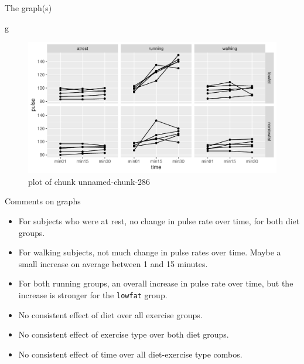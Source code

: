 \documentclass[ignorenonframetext,]{beamer}
\newenvironment{Shaded}{\begin{snugshade}}{\end{snugshade}}
\newcommand{\NormalTok}[1]{#1}
\begin{document}
\begin{frame}[fragile]{The graph(s)}
\protect\hypertarget{the-graphs}{}

\begin{Shaded}
\begin{Highlighting}[]
\NormalTok{g}
\end{Highlighting}
\end{Shaded}

\begin{figure}
\centering
\includegraphics{figure/unnamed-chunk-286-1.pdf}
\caption{plot of chunk unnamed-chunk-286}
\end{figure}

\end{frame}

\begin{frame}[fragile]{Comments on graphs}
\protect\hypertarget{comments-on-graphs}{}

\begin{itemize}
\item
  For subjects who were at rest, no change in pulse rate over time, for
  both diet groups.
\item
  For walking subjects, not much change in pulse rates over time. Maybe
  a small increase on average between 1 and 15 minutes.
\item
  For both running groups, an overall increase in pulse rate over time,
  but the increase is stronger for the \texttt{lowfat} group.
\item
  No consistent effect of diet over all exercise groups.
\item
  No consistent effect of exercise type over both diet groups.
\item
  No consistent effect of time over all diet-exercise type combos.
\end{itemize}

\end{frame}
\end{document}
